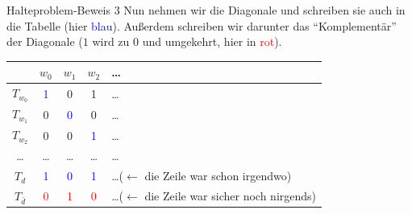 \begin{frame}{Halteproblem-Beweis 3}
    Nun nehmen wir die Diagonale und schreiben sie auch in die Tabelle (hier \textcolor{blue}{blau}). Außerdem schreiben wir darunter das ``Komplementär'' der Diagonale ($1$ wird zu $0$ und umgekehrt, hier in \textcolor{red}{rot}).
    \begin{table}
        \centering
        \begin{tabular}{ccccl}
            \toprule
                     & $w_0$ & $w_1$ & $w_2$ & \dots\\
             \midrule
             $T_{w_0}$ & \textcolor{blue}{1} & 0 & 1 & \dots\\
             $T_{w_1}$ & 0 & \textcolor{blue}{0} & 0 & \dots\\
             $T_{w_2}$ & 0 & 0 & \textcolor{blue}{1} & \dots\\
             \dots   &  \dots & \dots  & \dots  & \dots \\
             $T_d$ & \textcolor{blue}{1} & \textcolor{blue}{0} & \textcolor{blue}{1} &\dots ($\leftarrow$ die Zeile war schon irgendwo) \\
             $T_{\bar{d}}$ & \textcolor{red}{0} & \textcolor{red}{1} & \textcolor{red}{0} & \dots($\leftarrow$ die Zeile war sicher noch nirgends) \\
             \bottomrule
        \end{tabular}
    \end{table}
\end{frame}
